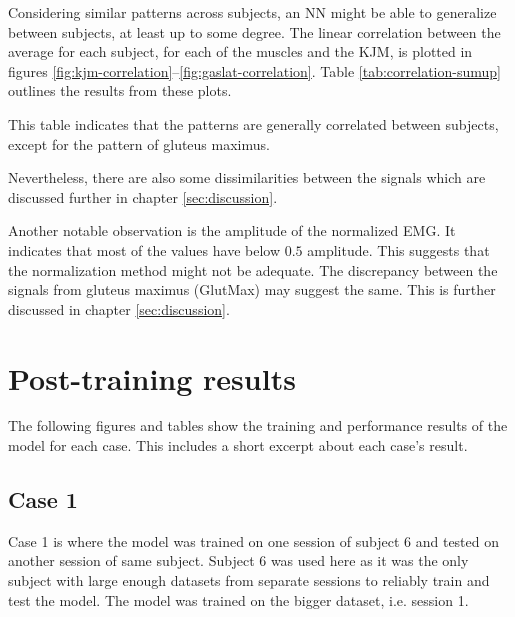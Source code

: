 \documentclass[../main.tex]{subfiles}
\begin{document}
Considering similar patterns across subjects, an \ac{NN} might be able to generalize between subjects, at least up to some degree.
The linear correlation between the average for each subject, for each of the muscles and the \ac{KJM}, is plotted in figures \ref{fig:kjm-correlation}--\ref{fig:gaslat-correlation}.
Table \ref{tab:correlation-sumup} outlines the results from these plots.

This table indicates that the patterns are generally correlated between subjects, except for the pattern of gluteus maximus.

Nevertheless, there are also some dissimilarities between the signals which are discussed further in chapter \ref{sec:discussion}.

Another notable observation is the amplitude of the normalized \ac{EMG}.
It indicates that most of the values have below $0.5$ amplitude.
This suggests that the normalization method might not be adequate.
The discrepancy between the signals from gluteus maximus (GlutMax) may suggest the same. 
This is further discussed in chapter \ref{sec:discussion}.

\section{Post-training results}
\label{sec:post-training-results}
The following figures and tables show the training and performance results of the model for each case.
This includes a short excerpt about each case's result.

\subsection{Case 1}
\label{sec:results-case1}
Case 1 is where the model was trained on one session of subject 6 and tested on another session of same subject.
Subject 6 was used here as it was the only subject with large enough datasets from separate sessions to reliably train and test the model.
The model was trained on the bigger dataset, i.e. session 1.
\end{document}
